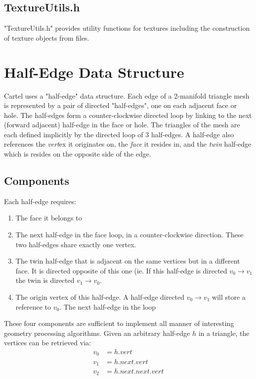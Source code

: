 \documentclass{article}
\begin{document}
\subsection{TextureUtils.h}
"TextureUtils.h" provides utility functions for textures including the construction of texture objects from files.

\section{Half-Edge Data Structure}
\label{sec:heds}
Cartel uses a "half-edge" data structure. Each edge of a 2-manifold triangle mesh is represented by a pair of directed "half-edges", one on each adjacent face or hole. The half-edges form a counter-clockwise directed loop by linking to the next (forward adjacent) half-edge in the face or hole. The triangles of the mesh are each defined implicitly by the directed loop of 3 half-edges. A half-edge also references the {\it vert}ex it originates on, the {\it face} it resides in, and the {\it twin} half-edge which is resides on the opposite side of the edge. 

\subsection{Components}
\label{sec:hedsComp}
Each half-edge requires:
\begin{enumerate}
\item The face it belongs to
\item The next half-edge in the face loop, in a counter-clockwise direction. These two half-edges share exactly one vertex.
\item The twin half-edge that is adjacent on the same vertices but in a different face. It is directed opposite of this one (ie. If this half-edge is directed $v_0 \to v_1$ the twin is directed $v_1 \to v_0$.
\item The origin vertex of this half-edge. A half-edge directed $v_0 \to v_1$ will store a reference to $v_0$. The next half-edge in the loop
\end{enumerate}

These four components are sufficient to implement all manner of interesting geometry processing algorithms. Given an arbitrary half-edge $h$ in a triangle, the vertices can be retrieved via:
\begin{equation}
\begin{aligned}
v_0 &= h.vert \\
v_1 &= h.next.vert \\
v_2 &= h.next.next.vert
\end{aligned} \label{eq:FaceLoop}
\end{equation}
\end{document}

